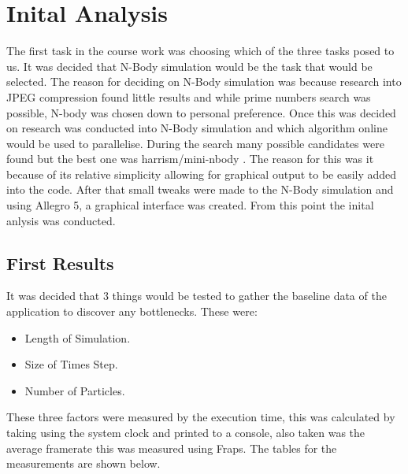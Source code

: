 \documentclass[12pt]{article}
\begin{document}
\section{Inital Analysis}
The first task in the course work was choosing which of the three tasks posed to us. It was decided that N-Body simulation would be the task that would be selected. The reason for deciding on N-Body simulation was because research into JPEG compression found little results and while prime numbers search was possible, N-body was chosen down to personal preference.
\newline 
Once this was decided on research was conducted into N-Body simulation and which algorithm online would be used to parallelise. During the search many possible candidates were found but the best one was harrism/mini-nbody . The reason for this was it because of its relative simplicity allowing for graphical output to be easily added into the code. After that small tweaks were made to the N-Body simulation and using Allegro 5, a graphical interface was created. From this point the inital anlysis was conducted.
\subsection{First Results}
It was decided that 3 things would be tested to gather the baseline data of the application to discover any bottlenecks. These were:
\begin{itemize}
 \item Length of Simulation.
 \item Size of Times Step.
  \item Number of Particles. 
\end{itemize}
These three factors were measured by the execution time, this was calculated by taking using the system clock and printed to a console, also taken was the average framerate this was measured using Fraps. The tables for the measurements are shown below.
\end{document}
